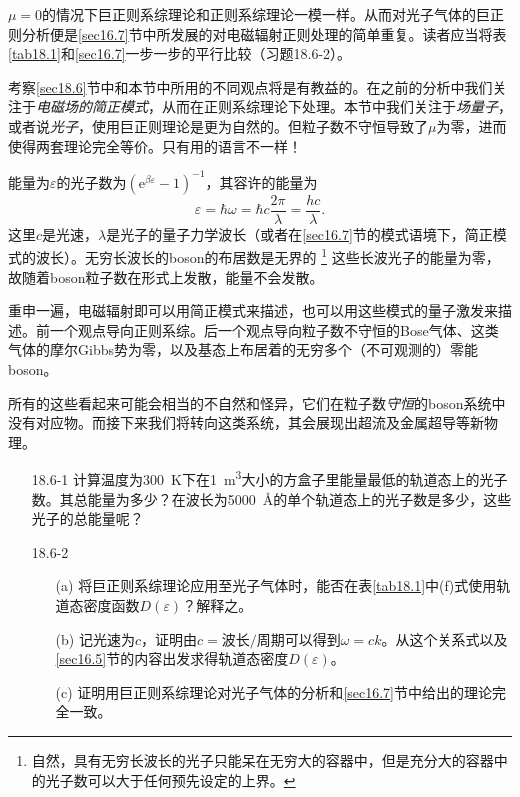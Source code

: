 $\mu=0$的情况下巨正则系综理论和正则系综理论一模一样。从而对光子气体的巨正则分析便是\ref{sec16.7}节中所发展的对电磁辐射正则处理的简单重复。读者应当将表\ref{tab18.1}和\ref{sec16.7}一步一步的平行比较（习题18.6-2）。

考察\ref{sec18.6}节中和本节中所用的不同观点将是有教益的。在之前的分析中我们关注于{\it 电磁场的简正模式}，从而在正则系综理论下处理。本节中我们关注于{\it 场量子}，或者说{\it 光子}，使用巨正则理论是更为自然的。但粒子数不守恒导致了$\mu$为零，进而使得两套理论完全等价。只有用的语言不一样！

能量为$\varepsilon$的光子数为$(\mathrm e^{\beta\varepsilon}-1)^{-1}$，其容许的能量为
\begin{equation}
\varepsilon=\hbar\omega=\hbar c\frac{2\pi}{\lambda}=\frac{hc}{\lambda}.
\end{equation}
这里$c$是光速，$\lambda$是光子的量子力学波长（或者在\ref{sec16.7}节的模式语境下，简正模式的波长）。无穷长波长的boson的布居数是无界的%
\footnote{自然，具有无穷长波长的光子只能呆在无穷大的容器中，但是充分大的容器中的光子数可以大于任何预先设定的上界。}%
这些长波光子的能量为零，故随着boson粒子数在形式上发散，能量不会发散。

重申一遍，电磁辐射即可以用简正模式来描述，也可以用这些模式的量子激发来描述。前一个观点导向正则系综。后一个观点导向粒子数不守恒的Bose气体、这类气体的摩尔Gibbs势为零，以及基态上布居着的无穷多个（不可观测的）零能boson。

所有的这些看起来可能会相当的不自然和怪异，它们在粒子数{\it 守恒}的boson系统中没有对应物。而接下来我们将转向这类系统，其会展现出超流及金属超导等新物理。

\begin{itemize}
\item[18.6-1] 计算温度为\SI{300}{\kelvin}下在\SI{1}{\cubic\meter}大小的方盒子里能量最低的轨道态上的光子数。其总能量为多少？在波长为\SI{5000}{\angstrom}的单个轨道态上的光子数是多少，这些光子的总能量呢？
\item[18.6-2] 
	\begin{itemize}
	\item[(a)] 将巨正则系综理论应用至光子气体时，能否在表\ref{tab18.1}中(f)式使用轨道态密度函数$D(\varepsilon)$？解释之。
	\item[(b)] 记光速为$c$，证明由$c=\text{波长}/\text{周期}$可以得到$\omega=ck$。从这个关系式以及\ref{sec16.5}节的内容出发求得轨道态密度$D(\varepsilon)$。
	\item[(c)] 证明用巨正则系综理论对光子气体的分析和\ref{sec16.7}节中给出的理论完全一致。
	\end{itemize}
\end{itemize}
